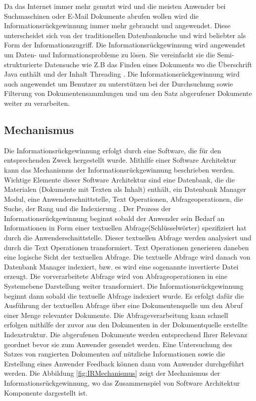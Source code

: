 Da das Internet immer mehr genutzt wird und die meisten Anwender bei Suchmaschinen oder E-Mail Dokumente abrufen wollen wird die Informationsrückgewinnung immer mehr gebraucht und angewendet. Diese unterscheidet sich von der traditionellen Datenbanksuche und wird beliebter als Form der Informationszugriff. Die Informationsrückgewinnung wird angewendet um Daten-  und Informationsprobleme zu lösen. Sie vereinfacht sie die Semi-strukturierte Datensuche wie Z.B das Finden eines Dokuments wo die Überschrift Java enthält und der Inhalt Threading \cite{MRS08}.
Die Informationsrückgewinnung wird auch angewendet um Benutzer zu unterstützen bei der Durchsuchung sowie Filterung von Dokumentensammlungen und um den Satz abgerufener Dokumente weiter zu verarbeiten.  


\subsection{Mechanismus}

Die Informationsrückgewinnung erfolgt durch eine Software, die für den entsprechenden Zweck hergestellt wurde.  Mithilfe einer Software Architektur kann das Mechanismus der Informationsrückgewinnung beschrieben werden. Wichtige Elemente dieser Software Architektur sind eine Datenbank, die die Materialen (Dokumente mit Texten als Inhalt) enthält, ein Datenbank Manager Modul, eine Anwenderschnittstelle, Text Operationen, Abfrageoperationen, die Suche, der Rang und die Indexierung \cite{BRI99}. 
Der Prozess der Informationsrückgewinnung beginnt sobald der Anwender sein Bedarf an Informationen in Form einer textuellen Abfrage(Schlüsselwörter) spezifiziert hat durch die Anwenderschnittstelle. Dieser textuellen Abfrage werden analysiert und durch die Text Operationen transformiert. Text Operationen generieren daneben eine logische Sicht der textuellen Abfrage. Die textuelle Abfrage wird danach von Datenbank Manager indexiert, bzw.  es wird eine sogenannte invertierte Datei erzeugt. Die vorverarbeitete Abfrage wird von Abfrageoperationen in eine Systemebene Darstellung weiter transformiert. Die Informationsrückgewinnung beginnt dann sobald die textuelle Abfrage indexiert wurde. Es erfolgt dafür die Ausführung der textuellen Abfrage über eine Dokumentenquelle um den Abruf einer Menge relevanter Dokumente. Die Abfrageverarbeitung kann schnell erfolgen mithilfe der zuvor aus den Dokumenten in der Dokumentquelle erstellte Indexstruktur. Die abgerufenen Dokumente werden entsprechend Ihrer Relevanz geordnet bevor sie zum Anwender gesendet werden. Eine Untersuchung des Satzes von rangierten Dokumenten auf nützliche Informationen sowie die Erstellung eines Anwender Feedback können dann vom Anwender durchgeführt werden. Die Abbildung \ref{fig:IRMechanismus} zeigt der Mechanismus der Informationsrückgewinnung, wo das Zusammenspiel von Software Architektur Komponente dargestellt ist.



